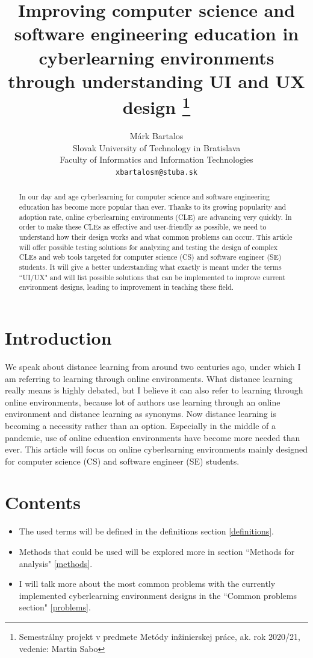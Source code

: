 \documentclass[10pt,english,a4paper]{article}
\title{Improving computer science and software 
engineering education in cyberlearning 
environments through understanding UI and UX design
\thanks{Semestrálny projekt v predmete Metódy inžinierskej práce,
 ak. rok 2020/21, vedenie: Martin Sabo}}
\author{Márk Bartalos \\[2pt]
        \small{Slovak University of Technology in Bratislava}\\
        \small{Faculty of Informatics and Information Technologies}\\
        \small{\texttt{xbartalosm@stuba.sk}}
}
\begin{document}
\maketitle

\begin{abstract}
    In our day and age cyberlearning for computer science and software engineering education has become more popular than ever.
    Thanks to its growing popularity and adoption rate, online cyberlearning environments (CLE) are advancing very quickly.
    In order to make these CLEs as effective and user-friendly as possible, we need to understand how their design
    works and what common problems can occur. This article will offer possible testing solutions for analyzing and testing
    the design of complex CLEs and web tools targeted for computer science (CS) and software engineer (SE) students. 
    It will give a better understanding what exactly is meant under the terms ``UI/UX" and will list possible solutions that
    can be implemented to improve current environment designs, leading to improvement in teaching these field.
\end{abstract}



\section{Introduction}
We speak about distance learning from around two centuries ago, under which
I am referring to learning through online environments\cite{moore_2011_elearning}. What distance learning really means is highly debated,
but I believe it can also refer to learning through online environments, because lot of authors use learning through an online environment and distance learning as
synonyms\cite{moore_2011_elearning}\cite{distance_definition}. 
Now distance learning is becoming a necessity rather than an option. Especially in the middle of a pandemic, use of online 
education environments have become more needed than ever. This article will focus on online cyberlearning environments 
mainly designed for computer science (CS) and software engineer (SE) students.

\section*{Contents}

\begin{itemize}
     \item The used terms will be defined in the definitions section \ref{definitions}.
     \item Methods that could be used will be explored more in section ``Methods for analysis" \ref{methods}.
     \item I will talk more about the most common problems with the currently implemented cyberlearning environment designs in the ``Common problems section" \ref{problems}.
\end{itemize}
\end{document}
